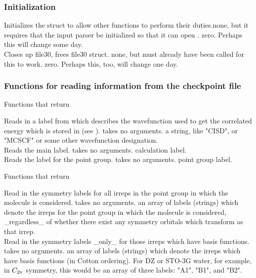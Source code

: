\subsubsection{Initialization}
{Initializes the  struct to allow other 
functions to perform their duties.}{none, but it requires that
the input parser be initialized so that it can open .}
{zero.  Perhaps this will change some day.} \\
{Closes up file30, frees file30 struct.}
{none, but  must already have been called for
this to work.}
{zero.  Perhaps this, too, will change one day.}

\subsubsection{Functions for reading information from the checkpoint file}
\begin{center}
Functions that return 
\end{center}
{Reads in a label from  which describes the
wavefunction used to get the correlated energy which is stored in
 (see ).}
{takes no arguments.}
{a string, like "CISD", or "MCSCF" or
some other wavefunction designation.}\\
{Reads the main  label.}
{takes no arguments.}
{calculation label.} \\
{Reads the label for the point group.}
{takes no arguments.}
{point group label.}

\begin{center}
Functions that return 
\end{center}
{Read in the symmetry labels for all irreps in the
point group in which the molecule is considered.}
{takes no arguments.}
{an array of labels (strings) which denote
the irreps for the point group  in which the molecule is considered,
\_regardless\_ of whether there exist any symmetry orbitals which
transform as that irrep.} \\
{Read in the symmetry labels \_only\_ for those irreps
which have basis functions.}
{takes no arguments.}
{an array of labels (strings) which denote
the irreps which have basis functions (in Cotton ordering).  For DZ or
STO-3G water, for example, in $C_{\rm 2v}$ symmetry, this would be an array of
three labels: "A1", "B1", and "B2".}

